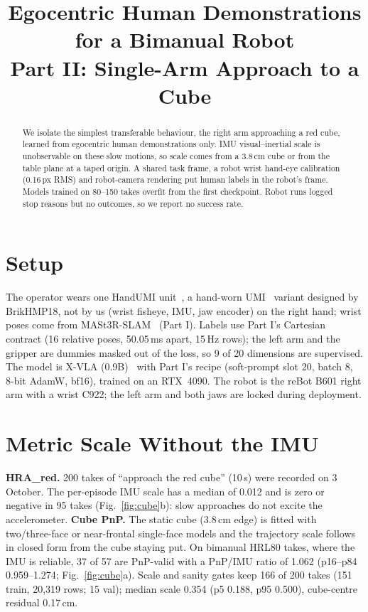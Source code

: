 \documentclass[conference,10pt]{IEEEtran}
\begin{document}
\title{Egocentric Human Demonstrations for a Bimanual Robot\\Part II: Single-Arm Approach to a Cube}
\author{
}
\maketitle

\begin{abstract}
We isolate the simplest transferable behaviour, the right arm approaching a red cube, learned from egocentric human
demonstrations only. IMU visual--inertial scale is unobservable on these slow motions, so scale comes from a 3.8\,cm cube or
from the table plane at a taped origin. A shared task frame, a robot wrist hand-eye calibration (0.16\,px RMS) and robot-camera
rendering put human labels in the robot's frame. Models trained on 80--150 takes overfit from the first checkpoint. Robot runs
logged stop reasons but no outcomes, so we report no success rate.
\end{abstract}

\section{Setup}
The operator wears one HandUMI unit~\cite{handumi_hw}, a hand-worn UMI~\cite{chi2024umi} variant designed by BrikHMP18, not by us (wrist fisheye, IMU, jaw encoder) on the right hand; wrist poses come from
MASt3R-SLAM~\cite{murai2025mast3rslam} (Part I). Labels use Part I's Cartesian contract (16 relative poses, 50.05\,ms apart, 15\,Hz
rows); the left arm and the gripper are dummies masked out of the loss, so 9 of 20 dimensions are supervised. The model is X-VLA
(0.9B)~\cite{zheng2025xvla} with Part I's recipe (soft-prompt slot 20, batch 8, 8-bit AdamW, bf16), trained on an RTX~4090. The
robot is the reBot B601 right arm with a wrist C922; the left arm and both jaws are locked during deployment.

\section{Metric Scale Without the IMU}
\textbf{HRA\_red.} 200 takes of ``approach the red cube'' (10\,s) were recorded on 3 October. The per-episode IMU scale has a
median of 0.012 and is zero or negative in 95 takes (Fig.~\ref{fig:cube}b): slow approaches do not excite the accelerometer. \textbf{Cube PnP.} The
static cube (3.8\,cm edge) is fitted with two/three-face or near-frontal single-face models and the trajectory scale follows in
closed form from the cube staying put. On bimanual HRL80 takes, where the IMU is reliable, 37 of 57 are PnP-valid with a PnP/IMU
ratio of 1.062 (p16--p84 0.959--1.274; Fig.~\ref{fig:cube}a). Scale and sanity gates keep 166 of 200 takes (151 train, 20{,}319 rows; 15 val); median
scale 0.354 (p5 0.188, p95 0.500), cube-centre residual 0.17\,cm.
\end{document}
